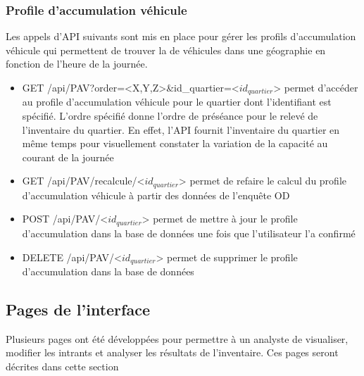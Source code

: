\subsubsection{Profile d'accumulation véhicule}
Les appels d'\ac{API} suivants sont mis en place pour gérer les profils d'accumulation véhicule \parencite{diallo_methodology_2015} qui permettent de trouver la \fg{} de véhicules dans une géographie en fonction de l'heure de la journée.
\begin{itemize}
    \item GET /api/PAV?order=<X,Y,Z>\&id\_quartier=<$id_{quartier}$> permet d'accéder au profile d'accumulation véhicule pour le quartier dont l'identifiant est spécifié. L'ordre spécifié donne l'ordre de préséance pour le relevé de l'inventaire du quartier. En effet, l'\ac{API} fournit l'inventaire du quartier en même temps pour visuellement  constater la variation de la capacité au courant de la journée
    \item GET /api/PAV/recalcule/<$id_{quartier}$> permet de refaire le calcul du profile d'accumulation véhicule à partir des données de l'enquête OD
    \item POST /api/PAV/<$id_{quartier}$> permet de mettre à jour le profile d'accumulation dans la base de données une fois que l'utilisateur l'a confirmé
    \item DELETE /api/PAV/<$id_{quartier}$> permet de supprimer le profile d'accumulation dans la base de données
\end{itemize}

\clearpage
\subsection{Pages de l'interface}
Plusieurs pages ont été développées pour permettre à un analyste de visualiser, modifier les intrants et analyser les résultats de l'inventaire. Ces pages seront décrites dans cette section

